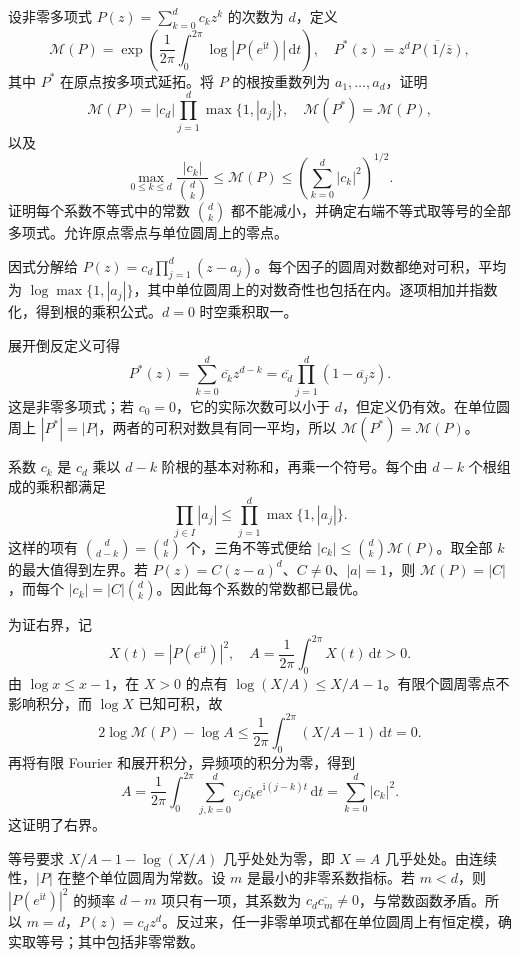 \begin{exercise}[多项式的几何平均与系数界]\label{b3:ex:18-draft-08}
设非零多项式 \(P(z)=\sum_{k=0}^dc_kz^k\) 的次数为 \(d\)，定义
\[
 \mathcal M(P)=\exp\left(\frac1{2\pi}\int_0^{2\pi}
 \log|P(e^{\mathrm it})|\,\mathrm dt\right),\quad
 P^*(z)=z^d\overline{P(1/\overline z)},
\]
其中 \(P^*\) 在原点按多项式延拓。将 \(P\) 的根按重数列为 \(a_1,\ldots,a_d\)，证明
\[
 \mathcal M(P)=|c_d|\prod_{j=1}^d\max\{1,|a_j|\},\quad
 \mathcal M(P^*)=\mathcal M(P),
\]
以及
\[
 \max_{0\le k\le d}\frac{|c_k|}{\binom dk}
 \le\mathcal M(P)
 \le\left(\sum_{k=0}^d|c_k|^2\right)^{1/2}.
\]
证明每个系数不等式中的常数 \(\binom dk\) 都不能减小，并确定右端不等式取等号的全部多项式。允许原点零点与单位圆周上的零点。
\end{exercise}
\begin{solution}
因式分解给 \(P(z)=c_d\prod_{j=1}^d(z-a_j)\)。每个因子的圆周对数都绝对可积，平均为 \(\log\max\{1,|a_j|\}\)，其中单位圆周上的对数奇性也包括在内。逐项相加并指数化，得到根的乘积公式。\(d=0\) 时空乘积取一。

展开倒反定义可得
\[
 P^*(z)=\sum_{k=0}^d\overline{c_k}z^{d-k}
 =\overline{c_d}\prod_{j=1}^d(1-\overline{a_j}z).
\]
这是非零多项式；若 \(c_0=0\)，它的实际次数可以小于 \(d\)，但定义仍有效。在单位圆周上 \(|P^*|=|P|\)，两者的可积对数具有同一平均，所以 \(\mathcal M(P^*)=\mathcal M(P)\)。

系数 \(c_k\) 是 \(c_d\) 乘以 \(d-k\) 阶根的基本对称和，再乘一个符号。每个由 \(d-k\) 个根组成的乘积都满足
\[
 \prod_{j\in I}|a_j|\le\prod_{j=1}^d\max\{1,|a_j|\}.
\]
这样的项有 \(\binom d{d-k}=\binom dk\) 个，三角不等式便给
\( |c_k|\le\binom dk\mathcal M(P)\)。取全部 \(k\) 的最大值得到左界。若 \(P(z)=C(z-a)^d\)、\(C\ne0\)、\(|a|=1\)，则 \(\mathcal M(P)=|C|\)，而每个 \(|c_k|=|C|\binom dk\)。因此每个系数的常数都已最优。

为证右界，记
\[
 X(t)=|P(e^{\mathrm it})|^2,\quad
 A=\frac1{2\pi}\int_0^{2\pi}X(t)\,\mathrm dt>0.
\]
由 \(\log x\le x-1\)，在 \(X>0\) 的点有
\(\log(X/A)\le X/A-1\)。有限个圆周零点不影响积分，而 \(\log X\) 已知可积，故
\[
 2\log\mathcal M(P)-\log A
 \le\frac1{2\pi}\int_0^{2\pi}(X/A-1)\,\mathrm dt=0.
\]
再将有限 Fourier 和展开积分，异频项的积分为零，得到
\[
 A=\frac1{2\pi}\int_0^{2\pi}
 \sum_{j,k=0}^dc_j\overline{c_k}e^{\mathrm i(j-k)t}\,\mathrm dt
 =\sum_{k=0}^d|c_k|^2.
\]
这证明了右界。

等号要求 \(X/A-1-\log(X/A)\) 几乎处处为零，即 \(X=A\) 几乎处处。由连续性，\(|P|\) 在整个单位圆周为常数。设 \(m\) 是最小的非零系数指标。若 \(m<d\)，则 \(|P(e^{\mathrm it})|^2\) 的频率 \(d-m\) 项只有一项，其系数为 \(c_d\overline{c_m}\ne0\)，与常数函数矛盾。所以 \(m=d\)，\(P(z)=c_dz^d\)。反过来，任一非零单项式都在单位圆周上有恒定模，确实取等号；其中包括非零常数。
\end{solution}
